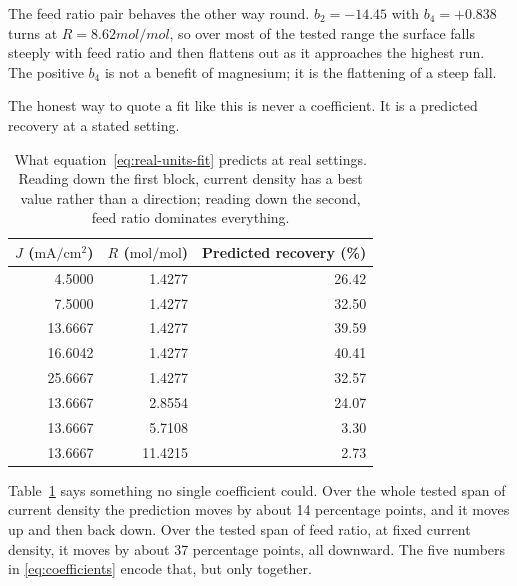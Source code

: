 The feed ratio pair behaves the other way round. $b_2 = -14.45$ with $b_4 = +0.838$ turns at
$R = 8.62\unit{mol/mol}$, so over most of the tested range the surface falls steeply with
feed ratio and then flattens out as it approaches the highest run. The positive $b_4$ is not a
benefit of magnesium; it is the flattening of a steep fall.

The honest way to quote a fit like this is never a coefficient. It is a predicted recovery at
a stated setting.

\begin{table}[htbp]
  \centering
  \caption{What equation~\eqref{eq:real-units-fit} predicts at real settings. Reading down
    the first block, current density has a best value rather than a direction; reading down
    the second, feed ratio dominates everything.}
  \label{tab:predictions-at-real-settings}
  \begin{tabular}{rrr}
    \toprule
    $J$ ($\mathrm{mA/cm^2}$) & $R$ ($\mathrm{mol/mol}$) & Predicted recovery (\%) \\
    \midrule
    4.5000  & 1.4277 & 26.42 \\
    7.5000  & 1.4277 & 32.50 \\
    13.6667 & 1.4277 & 39.59 \\
    16.6042 & 1.4277 & 40.41 \\
    25.6667 & 1.4277 & 32.57 \\
    \midrule
    13.6667 & 2.8554  & 24.07 \\
    13.6667 & 5.7108  & 3.30  \\
    13.6667 & 11.4215 & 2.73  \\
    \bottomrule
  \end{tabular}
\end{table}

Table~\ref{tab:predictions-at-real-settings} says something no single coefficient could. Over
the whole tested span of current density the prediction moves by about
14 percentage points, and it moves up and then back down. Over the tested span of feed ratio,
at fixed current density, it moves by about 37 percentage points, all downward. The
five numbers in \eqref{eq:coefficients} encode that, but only together.
